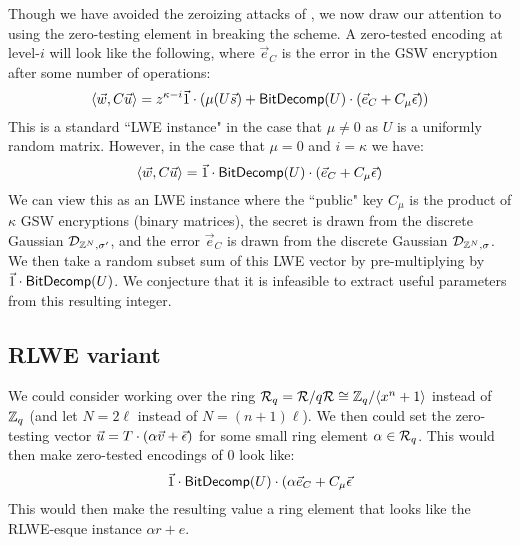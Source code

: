 Though we have avoided the zeroizing attacks of \cite{chl, cgh}, we now draw our attention to using the zero-testing element in breaking the scheme.  A zero-tested encoding at level-$i$ will look like the following, where $\vec{e}_C$ is the error in the GSW encryption after some number of operations:
$$\left<\vec{w}, C \vec{u}\right> = z^{\kappa-i}\vec{1}\cdot(\mu(U \vec{s}) + \mathsf{BitDecomp}(U)\cdot (\vec{e}_C + C_\mu\vec{\epsilon}))$$
This is a standard ``LWE instance" in the case that $\mu \not= 0$ as $U$ is a uniformly random matrix.  However, in the case that $\mu = 0$ and $i = \kappa$ we have:
\begin{equation}\label{eq:topleveltested}
\left<\vec{w}, C \vec{u}\right> = \vec{1}\cdot \mathsf{BitDecomp}(U)\cdot (\vec{e}_C + C_\mu\vec{\epsilon})
\end{equation}
We can view this as an LWE instance where the ``public" key $C_\mu$ is the product of $\kappa$ GSW encryptions (binary matrices), the secret is drawn from the discrete Gaussian $\mathcal{D}_{\mathbb{Z}^N, \sigma'}$, and the error $\vec{e}_C$ is drawn from the discrete Gaussian $\mathcal{D}_{\mathbb{Z}^N, \sigma}$.  We then take a random subset sum of this LWE vector by pre-multiplying by $\vec{1}\cdot\mathsf{BitDecomp}(U)$.  We conjecture that it is infeasible to extract useful parameters from this resulting integer.

\subsection{RLWE variant}
We could consider working over the ring $\mathcal{R}_q = \mathcal{R}/q\mathcal{R} \cong \mathbb{Z}_q/\langle x^n + 1 \rangle$ instead of $\mathbb{Z}_q$ (and let $N = 2\ell$ instead of $N = (n+1)\ell$).  We then could set the zero-testing vector $\vec{u} = T\cdot(\alpha\vec{v} + \vec{\epsilon})$ for some small ring element $\alpha \in \mathcal{R}_q$.  This would then make zero-tested encodings of $0$ look like:
$$\vec{1}\cdot \mathsf{BitDecomp}(U)\cdot (\alpha\vec{e}_C + C_\mu\vec{\epsilon}$$
This would then make the resulting value a ring element that looks like the RLWE-esque instance $\alpha r + e$.


